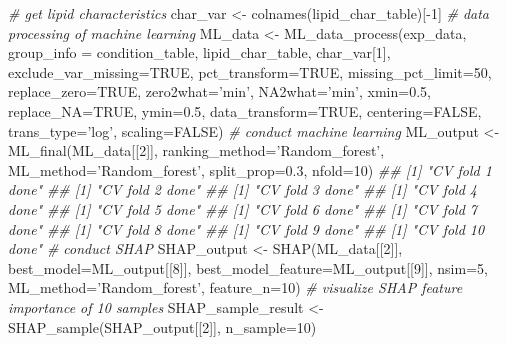 \documentclass[]{article}
\newcommand{\hlnum}[1]{\textcolor[rgb]{0.816,0.125,0.439}{#1}}%
\newcommand{\hlstr}[1]{\textcolor[rgb]{0.251,0.627,0.251}{#1}}%
\newcommand{\hlcom}[1]{\textcolor[rgb]{0.502,0.502,0.502}{\textit{#1}}}%
\newcommand{\hlopt}[1]{\textcolor[rgb]{0,0,0}{#1}}%
\newcommand{\hlstd}[1]{\textcolor[rgb]{0.251,0.251,0.251}{#1}}%
\newcommand{\hlkwc}[1]{\textcolor[rgb]{0.251,0.251,0.251}{#1}}%
\newcommand{\hlkwd}[1]{\textcolor[rgb]{0.878,0.439,0.125}{#1}}%
\newenvironment{Shaded}{\begin{myshaded}}{\end{myshaded}}
\newcommand{\KeywordTok}[1]{\hlkwd{#1}}
\newcommand{\DataTypeTok}[1]{\hlkwc{#1}}
\newcommand{\DecValTok}[1]{\hlnum{#1}}
\newcommand{\FloatTok}[1]{\hlnum{#1}}
\newcommand{\StringTok}[1]{\hlstr{#1}}
\newcommand{\CommentTok}[1]{\hlcom{#1}}
\newcommand{\OtherTok}[1]{{#1}}
\newcommand{\OperatorTok}[1]{\hlopt{#1}}
\newcommand{\NormalTok}[1]{\hlstd{#1}}
\begin{document}
\begin{Shaded}
\begin{Highlighting}[]
\CommentTok{# get lipid characteristics}
\NormalTok{char_var <-}\StringTok{ }\KeywordTok{colnames}\NormalTok{(lipid_char_table)[}\OperatorTok{-}\DecValTok{1}\NormalTok{]}
\CommentTok{# data processing of machine learning}
\NormalTok{ML_data <-}\StringTok{ }\KeywordTok{ML_data_process}\NormalTok{(exp_data, }\DataTypeTok{group_info =}\NormalTok{ condition_table,}
\NormalTok{                           lipid_char_table, char_var[}\DecValTok{1}\NormalTok{],}
                           \DataTypeTok{exclude_var_missing=}\OtherTok{TRUE}\NormalTok{, }\DataTypeTok{pct_transform=}\OtherTok{TRUE}\NormalTok{,}
                           \DataTypeTok{missing_pct_limit=}\DecValTok{50}\NormalTok{, }\DataTypeTok{replace_zero=}\OtherTok{TRUE}\NormalTok{,}
                           \DataTypeTok{zero2what=}\StringTok{'min'}\NormalTok{, }\DataTypeTok{NA2what=}\StringTok{'min'}\NormalTok{,}
                           \DataTypeTok{xmin=}\FloatTok{0.5}\NormalTok{, }\DataTypeTok{replace_NA=}\OtherTok{TRUE}\NormalTok{, }\DataTypeTok{ymin=}\FloatTok{0.5}\NormalTok{,}
                           \DataTypeTok{data_transform=}\OtherTok{TRUE}\NormalTok{, }\DataTypeTok{centering=}\OtherTok{FALSE}\NormalTok{,}
                           \DataTypeTok{trans_type=}\StringTok{'log'}\NormalTok{, }\DataTypeTok{scaling=}\OtherTok{FALSE}\NormalTok{)}
\CommentTok{# conduct machine learning}
\NormalTok{ML_output <-}\StringTok{ }\KeywordTok{ML_final}\NormalTok{(ML_data[[}\DecValTok{2}\NormalTok{]], }\DataTypeTok{ranking_method=}\StringTok{'Random_forest'}\NormalTok{,}
                      \DataTypeTok{ML_method=}\StringTok{'Random_forest'}\NormalTok{, }\DataTypeTok{split_prop=}\FloatTok{0.3}\NormalTok{, }\DataTypeTok{nfold=}\DecValTok{10}\NormalTok{)}
\CommentTok{## [1] "CV fold 1 done"}
\CommentTok{## [1] "CV fold 2 done"}
\CommentTok{## [1] "CV fold 3 done"}
\CommentTok{## [1] "CV fold 4 done"}
\CommentTok{## [1] "CV fold 5 done"}
\CommentTok{## [1] "CV fold 6 done"}
\CommentTok{## [1] "CV fold 7 done"}
\CommentTok{## [1] "CV fold 8 done"}
\CommentTok{## [1] "CV fold 9 done"}
\CommentTok{## [1] "CV fold 10 done"}
\CommentTok{# conduct SHAP}
\NormalTok{SHAP_output <-}\StringTok{ }\KeywordTok{SHAP}\NormalTok{(ML_data[[}\DecValTok{2}\NormalTok{]], }\DataTypeTok{best_model=}\NormalTok{ML_output[[}\DecValTok{8}\NormalTok{]],}
                    \DataTypeTok{best_model_feature=}\NormalTok{ML_output[[}\DecValTok{9}\NormalTok{]], }\DataTypeTok{nsim=}\DecValTok{5}\NormalTok{,}
                    \DataTypeTok{ML_method=}\StringTok{'Random_forest'}\NormalTok{, }\DataTypeTok{feature_n=}\DecValTok{10}\NormalTok{)}
\CommentTok{# visualize SHAP feature importance of 10 samples}
\NormalTok{SHAP_sample_result <-}\StringTok{ }\KeywordTok{SHAP_sample}\NormalTok{(SHAP_output[[}\DecValTok{2}\NormalTok{]], }\DataTypeTok{n_sample=}\DecValTok{10}\NormalTok{)}
\end{Highlighting}
\end{Shaded}
\end{document}
